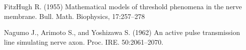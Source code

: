 \documentclass[12pt]{article}
\begin{document}
\begin{thebibliography}{99}

\newblock FitzHugh R. (1955) 
\newblock Mathematical models of threshold phenomena in the nerve membrane. 
\newblock Bull. Math. Biophysics, 17:257--278

\newblock Nagumo J., Arimoto S., and Yoshizawa S. (1962) 
\newblock An active pulse transmission line simulating nerve axon. 
\newblock Proc. IRE. 50:2061--2070.

\end{thebibliography}
\end{document}
